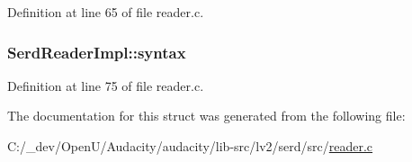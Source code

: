 Definition at line 65 of file reader.\+c.

\subsubsection[{\texorpdfstring{syntax}{syntax}}]{ Serd\+Reader\+Impl\+::syntax}\hypertarget{struct_serd_reader_impl_afda8a754daff17dd6a77e0b0eddab234}{}\label{struct_serd_reader_impl_afda8a754daff17dd6a77e0b0eddab234}


Definition at line 75 of file reader.\+c.



The documentation for this struct was generated from the following file\+:\begin{DoxyCompactItemize}
\item 
C\+:/\+\_\+dev/\+Open\+U/\+Audacity/audacity/lib-\/src/lv2/serd/src/\hyperlink{reader_8c}{reader.\+c}\end{DoxyCompactItemize}
